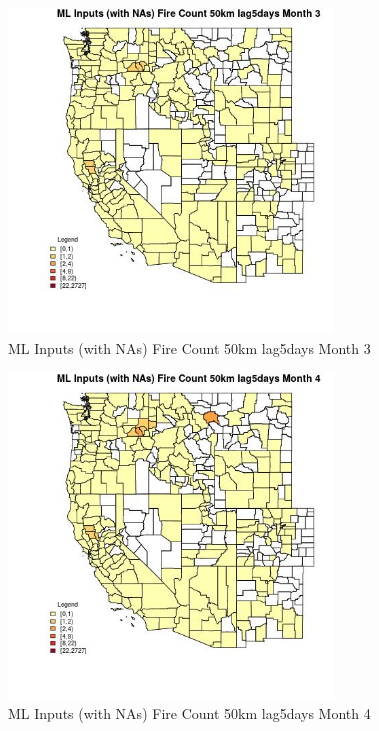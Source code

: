 \begin{figure} 
\centering  
\includegraphics[width=0.77\textwidth]{Code_Outputs/Report_ML_input_PM25_Step4_part_f_de_duplicated_aves_prioritize_24hr_obswNAs_CountyFire_Count_50km_lag5daysmedianMonth3.jpg} 
\caption{\label{fig:Report_ML_input_PM25_Step4_part_f_de_duplicated_aves_prioritize_24hr_obswNAsCountyFire_Count_50km_lag5daysmedianMonth3}ML Inputs (with NAs) Fire Count 50km lag5days Month 3} 
\end{figure} 
 

\begin{figure} 
\centering  
\includegraphics[width=0.77\textwidth]{Code_Outputs/Report_ML_input_PM25_Step4_part_f_de_duplicated_aves_prioritize_24hr_obswNAs_CountyFire_Count_50km_lag5daysmedianMonth4.jpg} 
\caption{\label{fig:Report_ML_input_PM25_Step4_part_f_de_duplicated_aves_prioritize_24hr_obswNAsCountyFire_Count_50km_lag5daysmedianMonth4}ML Inputs (with NAs) Fire Count 50km lag5days Month 4} 
\end{figure} 
 

